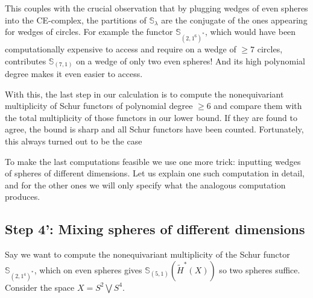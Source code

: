 \documentclass[12pt]{article}
\newcommand{\TransposePartition}[1]{{#1}^{\ast}}
\newcommand{\Schur}[1]{\mathbb{S}_{#1}}
\theoremstyle{plain}
\theoremstyle{definition}
\theoremstyle{remark}
\begin{document}
This couples with the crucial observation that by plugging wedges of even spheres into the CE-complex, the partitions of $\Schur{\lambda}$ are the conjugate of the ones appearing for wedges of circles. For example the functor $\Schur{\TransposePartition{(2,1^6)}}$, which would have been computationally expensive to access and require on a wedge of $\geq 7$ circles, contributes $\Schur{(7,1)}$ on a wedge of only two even spheres! And its high polynomial degree makes it even easier to access.


With this, the last step in our calculation is to compute the nonequivariant multiplicity of Schur functors of polynomial degree $\geq 6$ and compare them with the total multiplicity of those functors in our lower bound. If they are found to agree, the bound is sharp and all Schur functors have been counted. Fortunately, this always turned out to be the case


To make the last computations feasible we use one more trick: inputting wedges of spheres of different dimensions. Let us explain one such computation in detail, and for the other ones we will only specify what the analogous computation produces.

\subsection*{Step 4': Mixing spheres of different dimensions}

Say we want to compute the nonequivariant multiplicity of the Schur functor $\Schur{\TransposePartition{(2,1^4)}}$, which on even spheres gives $\Schur{(5,1)}(\tilde{H}^*(X))$ so two spheres suffice. Consider the space $X = S^2\bigvee S^4$.
\end{document}
